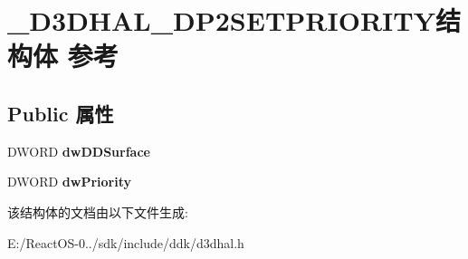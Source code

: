 \hypertarget{struct___d3_d_h_a_l___d_p2_s_e_t_p_r_i_o_r_i_t_y}{}\section{\+\_\+\+D3\+D\+H\+A\+L\+\_\+\+D\+P2\+S\+E\+T\+P\+R\+I\+O\+R\+I\+T\+Y结构体 参考}
\label{struct___d3_d_h_a_l___d_p2_s_e_t_p_r_i_o_r_i_t_y}
\subsection*{Public 属性}
\begin{DoxyCompactItemize}
\item 
\mbox{\label{struct___d3_d_h_a_l___d_p2_s_e_t_p_r_i_o_r_i_t_y_a4d7602b7a21d5ac07670e09665216410}} 
D\+W\+O\+RD {\bfseries dw\+D\+D\+Surface}
\item 
\mbox{\label{struct___d3_d_h_a_l___d_p2_s_e_t_p_r_i_o_r_i_t_y_a84e91c01ffd4e9557893ea632b852937}} 
D\+W\+O\+RD {\bfseries dw\+Priority}
\end{DoxyCompactItemize}


该结构体的文档由以下文件生成\+:\begin{DoxyCompactItemize}
\item 
E\+:/\+React\+O\+S-\/0../sdk/include/ddk/d3dhal.\+h\end{DoxyCompactItemize}
